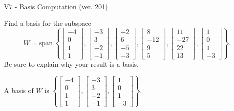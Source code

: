 \begin{exercise}
  \begin{exerciseTitle}V7 - Basis Computation (ver. 201)\end{exerciseTitle}
  \begin{exerciseStatement}
    Find a basis for the subspace 
\[W=\mathrm{span}\ \left\{\left[\begin{array}{r}
-4 \\
0 \\
1 \\
1
\end{array}\right] , \left[\begin{array}{r}
-3 \\
3 \\
-2 \\
-1
\end{array}\right] , \left[\begin{array}{r}
-2 \\
6 \\
-5 \\
-3
\end{array}\right] , \left[\begin{array}{r}
8 \\
-12 \\
9 \\
5
\end{array}\right] , \left[\begin{array}{r}
11 \\
-27 \\
22 \\
13
\end{array}\right] , \left[\begin{array}{r}
1 \\
0 \\
1 \\
-3
\end{array}\right]\right\}.\]
 Be sure to explain why your result is a basis.


  \end{exerciseStatement}
  \begin{exerciseAnswer}
   A basis of \(W\) is  \(\left\{\left[\begin{array}{r}
-4 \\
0 \\
1 \\
1
\end{array}\right] , \left[\begin{array}{r}
-3 \\
3 \\
-2 \\
-1
\end{array}\right] , \left[\begin{array}{r}
1 \\
0 \\
1 \\
-3
\end{array}\right]\right\}\).
  


  \end{exerciseAnswer}
\end{exercise}